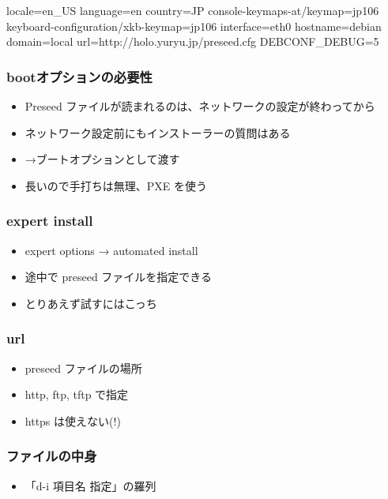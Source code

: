 \documentclass[mingoth,a4paper]{jsarticle}
\begin{document}
\begin{commandline}
locale=en_US language=en country=JP
console-keymaps-at/keymap=jp106
keyboard-configuration/xkb-keymap=jp106
interface=eth0 hostname=debian
domain=local url=http://holo.yuryu.jp/preseed.cfg
DEBCONF_DEBUG=5
\end{commandline}

\subsubsection{bootオプションの必要性}
\begin{itemize}
\item Preseed ファイルが読まれるのは、ネットワークの設定が終わってから
\item ネットワーク設定前にもインストーラーの質問はある
\item →ブートオプションとして渡す
\item 長いので手打ちは無理、PXE を使う
\end{itemize}

\subsubsection{expert install}
\begin{itemize}
\item expert options → automated install
\item 途中で preseed ファイルを指定できる
\item とりあえず試すにはこっち
\end{itemize}

\subsubsection{url}
\begin{itemize}
\item preseed ファイルの場所
\item http, ftp, tftp で指定
\item https は使えない(!)
\end{itemize}

\subsubsection{ファイルの中身}
\begin{itemize}
\item 「d-i 項目名 指定」の羅列
\end{itemize}

\end{document}

